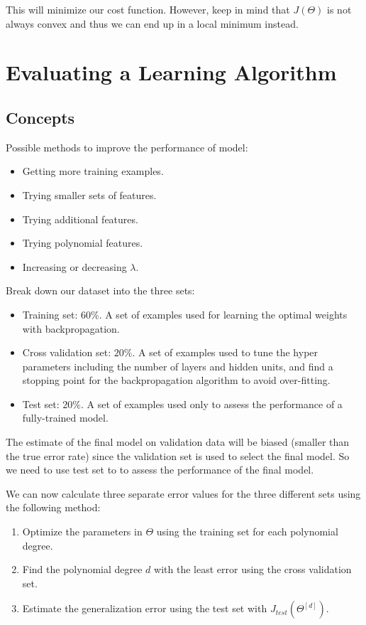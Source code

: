 \documentclass{article}
\begin{document}
\noindent This will minimize our cost function. However, keep in mind that \(J(\Theta)\) is not always convex and thus we can end up in a local minimum instead. 

\section{Evaluating a Learning Algorithm}

\subsection{Concepts}

\noindent Possible methods to improve the performance of model:
\begin{itemize}
\item Getting more training examples.
\item Trying smaller sets of features.
\item Trying additional features.
\item Trying polynomial features.
\item Increasing or decreasing \(\lambda\).
\end{itemize}

\noindent Break down our dataset into the three sets:
\begin{itemize}
\item Training set: \(60\%\). A set of examples used for learning the optimal weights with backpropagation.
\item Cross validation set: \(20\%\). A set of examples used to tune the hyper parameters including the number of layers and hidden units, and find a stopping point for the backpropagation algorithm to avoid over-fitting.
\item Test set: \(20\%\). A set of examples used only to assess the performance of a fully-trained model.
\end{itemize}

\noindent The estimate of the final model on validation data will be biased (smaller than the true error rate) since the validation set is used to select the final model. So we need to use test set to to assess the performance of the final model.

\bigskip

\noindent We can now calculate three separate error values for the three different sets using the following method:
\begin{enumerate}
\item Optimize the parameters in \(\Theta\) using the training set for each polynomial degree.
\item Find the polynomial degree \(d\) with the least error using the cross validation set.
\item Estimate the generalization error using the test set with \(J_{test}(\Theta^{[d]})\).
\end{enumerate}
\end{document}
